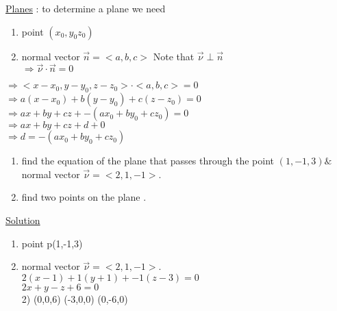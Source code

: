  \noindent{\color{smalt(darkpowderblue)}\rule{\linewidth}{.2mm}}
{\color{smalt(darkpowderblue)}\underline{Planes}} : to determine a plane we need \begin{enumerate}
    \item point $(x_0 , y_0 z_0 )$
    \item normal vector $\overrightarrow{n} = <a,b,c>$ \hspace{2cm} Note that $\overrightarrow{\nu} \perp \overrightarrow{n}$\\
$\Rightarrow \overrightarrow{\nu} \cdot \overrightarrow{n} = 0$
\end{enumerate}
$\Rightarrow <x-x_0 , y-y_0 , z-z_0> \cdot <a,b,c> = 0$\\
$\Rightarrow  a(x-x_0) + b(y-y_0) +c(z-z_0) = 0$\\
$\Rightarrow  ax + by + cz + -(ax_0 + by_0 +cz_0) = 0$\\
$\Rightarrow  ax + by +cz +d + 0 $\\
$\Rightarrow  d = -(ax_0 + by_0 + cz_0 )$\\
 \noindent{\color{smalt(darkpowderblue)}\rule{\linewidth}{.2mm}}
\begin{example}
 \begin{enumerate}
     \item find the equation of the plane that passes through the point $(1,-1,3) \&$  normal vector $\overrightarrow{\nu} = <2,1,-1> .$
     \item find two points on the plane .
 \end{enumerate}
{\color{smalt(darkpowderblue)}\underline{Solution}}
\begin{enumerate}
    \item point p(1,-1,3) 
    \item normal vector $\overrightarrow{\nu} = <2,1,-1> .$\\
$2(x-1) + 1(y+1) + -1(z-3) = 0 $\\
$ 2x +y -z +6 = 0$\\
2) (0,0,6)
(-3,0,0)
(0,-6,0) 
\end{enumerate}
\end{example} 
 \noindent{\color{smalt(darkpowderblue)}\rule{\linewidth}{.2mm}}
